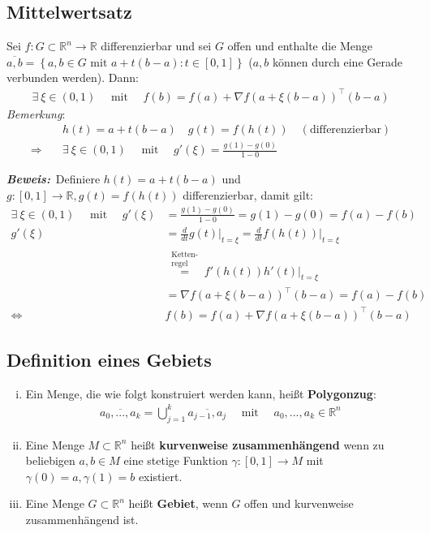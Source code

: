 \documentclass[11pt,a4paper]{book}
\newcommand {\R}	{\mathbb{R}}
\newcommand {\Rn}	{\mathbb{R}^n}
\newcommand{\1}    	{\mathbbm{1}}
\newcommand{\mitt}	{\textrm{ mit }}
\newcommand{\Beweis}[1][Beweis]
{\begin{mdframed}[backgroundcolor=gray!10,linewidth=0pt]\noindent\textit{\textbf{{#1}:}}~}
\newcommand{\QED}	{\end{mdframed}}
\newcommand{\Bemerkung}	{\noindent\textit{Bemerkung}: }
\begin{document}
\subsection{Mittelwertsatz}
Sei \(f: G \subset \Rn \rightarrow \R\) differenzierbar und sei \(G\) offen und enthalte die Menge \(\overline{a,b} = \left\{ a,b \in G \mitt  a + t(b-a) : t \in [0,1] \right\}\) (\(a,b\) können durch eine Gerade verbunden werden). Dann:
\begin{align*}
	\exists~ \xi \in (0,1)\quad\mitt\quad f(b) = f(a) + \nabla f(a + \xi(b-a))^\top (b-a) 
\end{align*}
\Bemerkung
\begin{align*}
	& h(t) = a + t(b-a) \quad
	g(t) = f(h(t)) \quad (\textrm{differenzierbar}) \\
	\Rightarrow \quad & \exists~ \xi \in (0,1)\quad\mitt\quad g'(\xi) = \frac{g(1) - g(0)}{1-0}
\end{align*}
\Beweis Definiere \(h(t) = a + t(b-a)\) und \(g: [0,1] \rightarrow \R, g(t) = f(h(t))\) differenzierbar, damit gilt:
\begin{align*}
	\exists~ \xi \in (0,1) \quad\mitt\quad g'(\xi) &= \frac{g(1) - g(0)}{1 - 0} = g(1) - g(0) = f(a) - f(b) \\
	g'(\xi) &= \frac{d}{dt} g(t) \vert_{t = \xi} = \frac{d}{dt} f(h(t)) \vert_{t = \xi} \\
	&\stackrel{\substack{\textrm{Ketten-}\\\textrm{regel}}}{=} f'(h(t))h'(t) \vert_{t = \xi} \\
	&= \nabla f( a + \xi(b-a) )^\top (b-a) = f(a) - f(b) \\
	\Leftrightarrow \quad& f(b) = f(a) + \nabla f( a + \xi(b-a) )^\top (b-a)
\end{align*}
\QED

\subsection{Definition eines Gebiets}

\begin{enumerate}[(i)]
	\item Ein Menge, die wie folgt konstruiert werden kann, heißt \textbf{Polygonzug}:
	\begin{align*}
		\overline{ a_0, ..., a_k} = \bigcup_{j=1}^k \overline{a_{j-1},a_j} \quad\mitt\quad a_0, ..., a_k \in \Rn
	\end{align*}	
	\item Eine Menge \(M \subset \Rn\) heißt \textbf{kurvenweise zusammenhängend} wenn zu beliebigen \(a,b \in M\) eine stetige Funktion \(\gamma : [0,1] \rightarrow M\) mit \(\gamma(0) = a, \gamma(1) = b\) existiert.
	\item Eine Menge \(G \subset \Rn\) heißt \textbf{Gebiet}, wenn \(G\) offen und kurvenweise zusammenhängend ist.
\end{enumerate}
\end{document}
